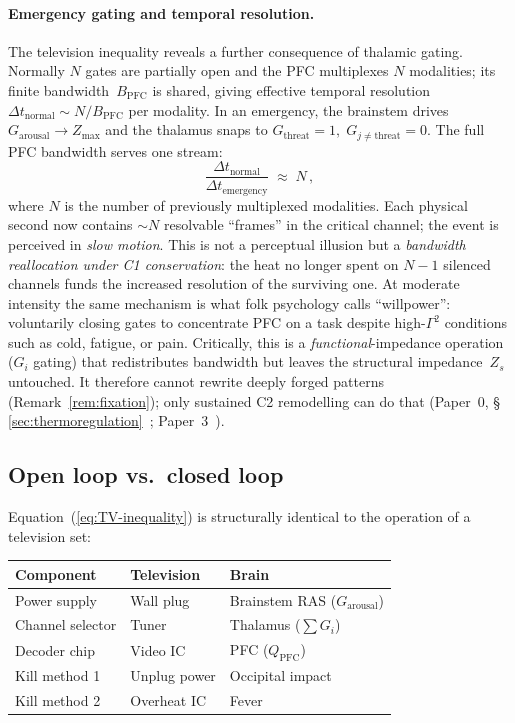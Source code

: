 \documentclass[aps,pre,twocolumn,superscriptaddress,floatfix]{revtex4-2}
\newcommand{\Zarousal}{G_{\text{arousal}}}
\newcommand{\QPFC}{Q_{\text{PFC}}}
\begin{document}
\paragraph{Emergency gating and temporal resolution.}
The television inequality reveals a further consequence
of thalamic gating.
Normally $N$ gates are partially open and the PFC
multiplexes $N$ modalities;
its finite bandwidth~$B_{\text{PFC}}$ is shared,
giving effective temporal resolution
$\Delta t_{\text{normal}} \sim N / B_{\text{PFC}}$
per modality.
In an emergency, the brainstem drives
$\Zarousal \to Z_{\max}$ and the thalamus snaps to
$G_{\text{threat}} = 1,\; G_{j \neq \text{threat}} = 0$.
The full PFC bandwidth serves one stream:
\begin{equation}
  \frac{\Delta t_{\text{normal}}}
       {\Delta t_{\text{emergency}}}
  \;\approx\; N\,,
  \label{eq:time-dilation}
\end{equation}
where $N$ is the number of previously multiplexed
modalities.
Each physical second now contains $\sim\!N$ resolvable
``frames'' in the critical channel;
the event is perceived in \emph{slow motion}.
This is not a perceptual illusion but a
\emph{bandwidth reallocation under C1 conservation}:
the heat no longer spent on $N-1$ silenced channels
funds the increased resolution of the surviving one.
At moderate intensity the same mechanism is
what folk psychology calls ``willpower'': voluntarily
closing gates to concentrate PFC on a task despite
high-$\Gamma^2$ conditions such as cold, fatigue,
or pain.
Critically, this is a \emph{functional}-impedance
operation ($G_i$ gating) that redistributes bandwidth
but leaves the structural impedance~$Z_s$ untouched.
It therefore cannot rewrite deeply forged patterns
(Remark~\ref{rem:fixation}); only sustained C2
remodelling can do that
(Paper~0, \S\,\ref{sec:thermoregulation}~\cite{Paper0};
Paper~3~\cite{Paper3}).

\subsection{Open loop vs.\ closed loop}

Equation~(\ref{eq:TV-inequality}) is structurally identical
to the operation of a television set:
\begin{center}
\begin{tabular}{@{}lll@{}}
\toprule
Component & Television & Brain \\
\midrule
Power supply & Wall plug & Brainstem RAS ($\Zarousal$) \\
Channel selector & Tuner & Thalamus ($\sum G_i$) \\
Decoder chip & Video IC & PFC ($\QPFC$) \\
\midrule
Kill method 1 & Unplug power & Occipital impact \\
Kill method 2 & Overheat IC & Fever \\
\bottomrule
\end{tabular}
\end{center}
\end{document}
